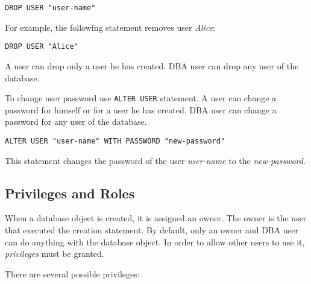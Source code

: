 \documentclass[a4paper,12pt]{article}
\begin{document}
\begin{verbatim}
DROP USER "user-name"
\end{verbatim}

For example, the following statement removes user \emph{Alice}:

\begin{verbatim}
DROP USER "Alice"
\end{verbatim}

A user can drop only a user he has created. DBA user can drop any user of the
database.

To change user password use \verb!ALTER USER! statement. A user can change a
password for himself or for a user he has created. DBA user can change a
password for any user of the database.

\begin{verbatim}
ALTER USER "user-name" WITH PASSWORD "new-password"
\end{verbatim}

This statement changes the password of the user \emph{user-name} to
the \emph{new-password}.


\subsection{Privileges and Roles}
\label{roles}

When a database object is created, it is assigned an owner. The owner is the
user that executed the creation statement. By default, only an owner and DBA
user can do anything with the database object. In order to allow other users
to use it, \emph{privileges} must be granted.

There are several possible privileges:
\end{document}
